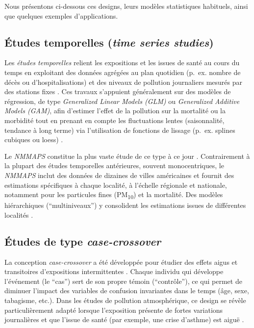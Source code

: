 Nous présentons ci-dessous ces designs, leurs modèles statistiques habituels, ainsi que quelques exemples d’applications.


\subsection{Études temporelles (\emph{time series studies})}
Les \emph{études temporelles} relient les expositions et les issues de santé au cours du temps en exploitant des données agrégées au plan quotidien (p.~ex. nombre de décès ou d’hospitalisations) et des niveaux de pollution journaliers mesurés par des stations fixes \citep{BellSametDominici2004}. Ces travaux s’appuient généralement sur des modèles de régression, de type \emph{Generalized Linear Models (GLM)} ou \emph{Generalized Additive Models (GAM)}, afin d’estimer l’effet de la pollution sur la mortalité ou la morbidité tout en prenant en compte les fluctuations lentes (saisonnalité, tendance à long terme) via l’utilisation de fonctions de lissage (p.~ex. splines cubiques ou loess) \citep{McCullaghNelder1989,HastieTibshirani1990}.

Le \emph{NMMAPS} constitue la plus vaste étude de ce type à ce jour \citep{DominiciMcDermottDaniels2003,SametDominiciZeger2000,SametZegerDominici2000,SametDominiciCurriero2000,DominiciPengZeger2007,BellMcDermottZeger2004,PengDominiciPastorBarriuso2005,DominiciSametZeger2000}. Contrairement à la plupart des études temporelles antérieures, souvent monocentriques, le \emph{NMMAPS} inclut des données de dizaines de villes américaines et fournit des estimations spécifiques à chaque localité, à l’échelle régionale et nationale, notamment pour les particules fines (PM\textsubscript{10}) et la mortalité. Des modèles hiérarchiques (``multiniveaux'') y consolident les estimations issues de différentes localités \citep{DominiciSametZeger2000}.

\subsection{Études de type \emph{case-crossover}}
La conception \emph{case-crossover} \citep{Maclure1991,Jaakkola2003,MaclureMittleman2000} a été développée pour étudier des effets aigus et transitoires d’expositions intermittentes \citep{BreslowDay1980,Schlesselman1994}. Chaque individu qui développe l’événement (le ``cas'') sert de son propre témoin (``contrôle''), ce qui permet de diminuer l’impact des variables de confusion invariantes dans le temps (âge, sexe, tabagisme, etc.). Dans les études de pollution atmosphérique, ce design se révèle particulièrement adapté lorsque l’exposition présente de fortes variations journalières et que l’issue de santé (par exemple, une crise d’asthme) est aiguë \citep{MaclureMittleman2000,Jaakkola2003}.

